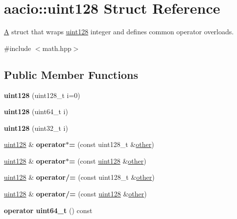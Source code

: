 \hypertarget{structaacio_1_1uint128}{}\section{aacio\+:\+:uint128 Struct Reference}
\label{structaacio_1_1uint128}


\mbox{\hyperlink{struct_a}{A}} struct that wraps \mbox{\hyperlink{structaacio_1_1uint128}{uint128}} integer and defines common operator overloads.  




{\ttfamily \#include $<$math.\+hpp$>$}

\subsection*{Public Member Functions}
\begin{DoxyCompactItemize}
\item 
\mbox{\label{structaacio_1_1uint128_ae36870b8735e3944f4ea3ced110e4737}} 
{\bfseries uint128} (uint128\+\_\+t i=0)
\item 
\mbox{\label{structaacio_1_1uint128_ad380b23370c3a1237132c29f6fa81a79}} 
{\bfseries uint128} (uint64\+\_\+t i)
\item 
\mbox{\label{structaacio_1_1uint128_acfa18c8ace83236d01fd99c2e356f2a5}} 
{\bfseries uint128} (uint32\+\_\+t i)
\item 
\mbox{\label{structaacio_1_1uint128_a1360a80fe1f7b5138983bf65343f59ce}} 
\mbox{\hyperlink{structaacio_1_1uint128}{uint128}} \& {\bfseries operator$\ast$=} (const uint128\+\_\+t \&\mbox{\hyperlink{structother}{other}})
\item 
\mbox{\label{structaacio_1_1uint128_a43abda93c7c2f3252de576d8780bd0bf}} 
\mbox{\hyperlink{structaacio_1_1uint128}{uint128}} \& {\bfseries operator$\ast$=} (const \mbox{\hyperlink{structaacio_1_1uint128}{uint128}} \&\mbox{\hyperlink{structother}{other}})
\item 
\mbox{\label{structaacio_1_1uint128_aff9c78c235167d44d6dea5405568c03e}} 
\mbox{\hyperlink{structaacio_1_1uint128}{uint128}} \& {\bfseries operator/=} (const uint128\+\_\+t \&\mbox{\hyperlink{structother}{other}})
\item 
\mbox{\label{structaacio_1_1uint128_abde6bd6eb2d7918100b73bf0ad76d5ff}} 
\mbox{\hyperlink{structaacio_1_1uint128}{uint128}} \& {\bfseries operator/=} (const \mbox{\hyperlink{structaacio_1_1uint128}{uint128}} \&\mbox{\hyperlink{structother}{other}})
\item 
\mbox{\label{structaacio_1_1uint128_a444a70e9b94e4a483bdfd1d2296d0483}} 
{\bfseries operator uint64\+\_\+t} () const
\end{DoxyCompactItemize}
